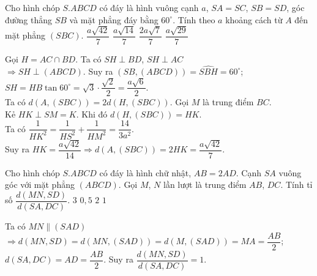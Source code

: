 \begin{ex}%
 Cho hình chóp $S.ABCD$ có đáy là hình vuông cạnh $a$, $SA=SC$, $SB=SD$, góc đường thẳng $SB$ và mặt phẳng đáy bằng $60^\circ$. Tính theo $a$ khoảng cách từ $A$ đến mặt phẳng $(SBC)$.
\choice
{\True $\dfrac{a\sqrt{42}}{7}$}
{$\dfrac{a\sqrt{14}}{7}$}
{$\dfrac{2a\sqrt{7}}{7}$}
{$\dfrac{a\sqrt{29}}{7}$}
\loigiai
{
\immini
{Gọi $H=AC\cap BD$. Ta có $SH\perp BD$, $SH\perp AC$\\
$\Rightarrow SH\perp (ABCD)$. Suy ra $(SB, (ABCD))=\widehat{SBH}=60^\circ$;\\ 
$SH=HB\tan60^\circ=\sqrt{3}\cdot\dfrac{\sqrt{2}}{2}=\dfrac{a\sqrt{6}}{2}$.\\
Ta có $d(A, (SBC))=2d(H, (SBC))$. Gọi $M$ là trung điểm $BC$.\\ 
Kẻ $HK\perp SM=K$. Khi đó $d(H, (SBC))=HK$.\\ 
Ta có $\dfrac{1}{HK^2}=\dfrac{1}{HS^2}+\dfrac{1}{HM^2}=\dfrac{14}{3a^2}$.\\
Suy ra $HK=\dfrac{a\sqrt{42}}{14}\Rightarrow d(A, (SBC))=2HK=\dfrac{a\sqrt{42}}{7}$.
}
{
}
}
\end{ex}

\begin{ex}%
 Cho hình chóp $S.ABCD$ có đáy là hình chữ nhật, $AB=2AD$. Cạnh $SA$ vuông góc với mặt phẳng $(ABCD)$. Gọi $M$, $N$ lần lượt là trung điểm $AB$, $DC$. Tính tỉ số $\dfrac{d(MN,SD)}{d(SA,DC)}$.
\choice
{$3$	}
{$0{,}5$}
{$2$	}
{\True $1$}
\loigiai
{
\immini
{Ta có $MN\parallel (SAD)$\\$
\Rightarrow d(MN,SD)=d(MN, (SAD))=d(M, (SAD))=MA=\dfrac{AB}{2}$;\\ 
$d(SA, DC)=AD=\dfrac{AB}{2}$. Suy ra $\dfrac{d(MN,SD)}{d(SA,DC)}=1$.
}
{
}
}
\end{ex}

